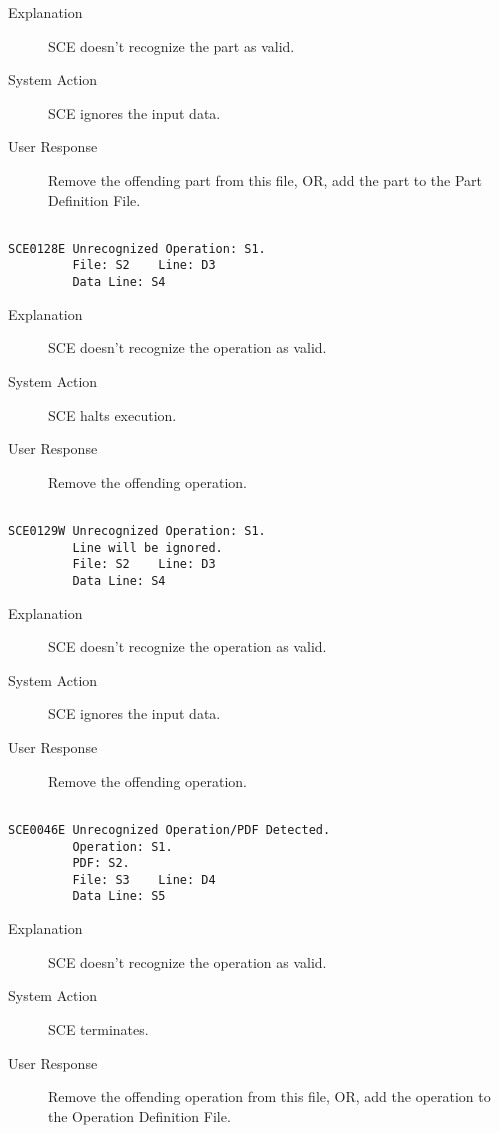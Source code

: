 \begin{description}
\item[Explanation]  SCE doesn't recognize the part as valid.

\item[System Action]  SCE ignores the input data.

\item[User Response]  Remove the offending part from this file, OR, add the part to the Part Definition File.
\end{description}
\hrulefill
\begin{verbatim}

SCE0128E Unrecognized Operation: S1.
         File: S2    Line: D3
         Data Line: S4
\end{verbatim}
\begin{description}
\item[Explanation]  SCE doesn't recognize the operation as valid.

\item[System Action]  SCE halts execution.

\item[User Response]  Remove the offending operation.
\end{description}
\hrulefill
\begin{verbatim}

SCE0129W Unrecognized Operation: S1.
         Line will be ignored.
         File: S2    Line: D3
         Data Line: S4
\end{verbatim}
\begin{description}
\item[Explanation]  SCE doesn't recognize the operation as valid.

\item[System Action]  SCE ignores the input data.

\item[User Response]  Remove the offending operation.
\end{description}
\hrulefill
\begin{verbatim}

SCE0046E Unrecognized Operation/PDF Detected.
         Operation: S1.
         PDF: S2.
         File: S3    Line: D4
         Data Line: S5
\end{verbatim}
\begin{description}
\item[Explanation]  SCE doesn't recognize the operation as valid.

\item[System Action]  SCE terminates.

\item[User Response]  Remove the offending operation from this file, OR, add the operation to the Operation Definition File.
\end{description}
